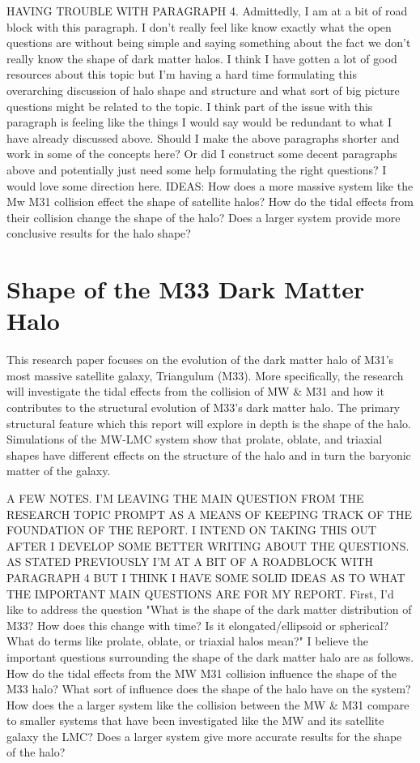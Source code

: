 \documentclass[fleqn,usenatbib]{mnras}
\begin{document}
\hspace{6mm} HAVING TROUBLE WITH PARAGRAPH 4. Admittedly, I am at a bit of road block with this paragraph. I don't really feel like know exactly what the open questions are without being simple and saying something about the fact we don't really know the shape of dark matter halos. I think I have gotten a lot of good resources about this topic but I'm having a hard time formulating this overarching discussion of halo shape and structure and what sort of big picture questions might be related to the topic. I think part of the issue with this paragraph is feeling like the things I would say would be redundant to what I have already discussed above. Should I make the above paragraphs shorter and work in some of the concepts here? Or did I construct some decent paragraphs above and potentially just need some help formulating the right questions? I would love some direction here. IDEAS: How does a more massive system like the Mw M31 collision effect the shape of satellite halos? How do the tidal effects from their collision change the shape of the halo? Does a larger system provide more conclusive results for the halo shape? 


\section{Shape of the M33 Dark Matter Halo}
\hspace{6mm}This research paper focuses on the evolution of the dark matter halo of M31's most massive satellite galaxy, Triangulum (M33). More specifically, the research will investigate the tidal effects from the collision of MW \& M31 and how it contributes to the structural evolution of M33's dark matter halo. The primary structural feature which this report will explore in depth is the shape of the halo. Simulations of the MW-LMC system show that prolate, oblate, and triaxial shapes have different effects on the structure of the halo and in turn the baryonic matter of the galaxy.  

\hspace{6mm}A FEW NOTES. I'M LEAVING THE MAIN QUESTION FROM THE RESEARCH TOPIC PROMPT AS A MEANS OF KEEPING TRACK OF THE FOUNDATION OF THE REPORT. I INTEND ON TAKING THIS OUT AFTER I DEVELOP SOME BETTER WRITING ABOUT THE QUESTIONS. AS STATED PREVIOUSLY I'M AT A BIT OF A ROADBLOCK WITH PARAGRAPH 4 BUT I THINK I HAVE SOME SOLID IDEAS AS TO WHAT THE IMPORTANT MAIN QUESTIONS ARE FOR MY REPORT. First, I'd like to address the question "What is the shape of the dark matter distribution of M33? How does this change with time? Is it elongated/ellipsoid or spherical? What do terms like prolate, oblate, or triaxial halos mean?" I  believe the important questions surrounding the shape of the dark matter halo are as follows. How do the tidal effects from the MW M31 collision influence the shape of the M33 halo? What sort of influence does the shape of the halo have on the system? How does the a larger system like the collision between the MW \& M31 compare to smaller systems that have been investigated like the MW and its satellite galaxy the LMC? Does a larger system give more accurate results for the shape of the halo?
\end{document}

